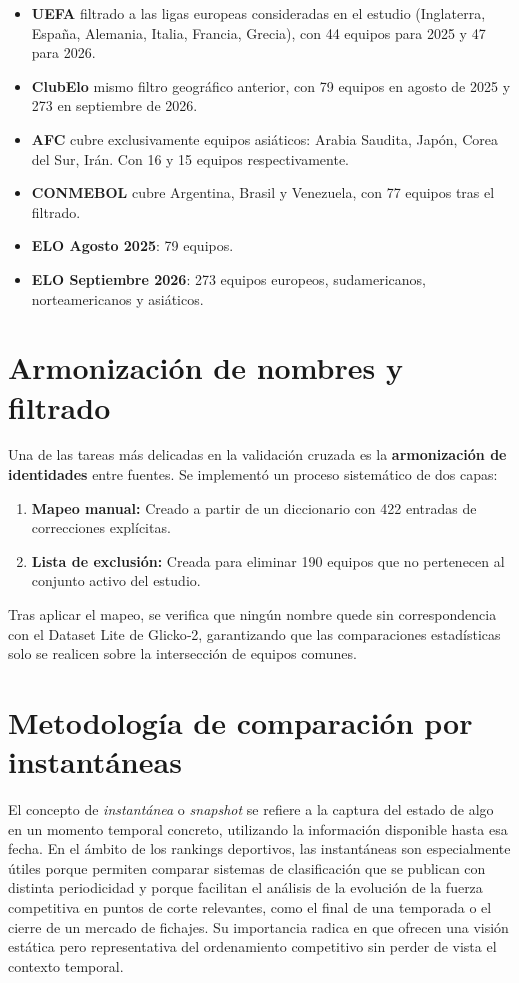 \begin{itemize}	
	\item \textbf{UEFA} filtrado a las ligas europeas consideradas en el estudio (Inglaterra, Espa\~na, Alemania, Italia, Francia, Grecia), con 44 equipos para 2025 y 47 para 2026.
	\item \textbf{ClubElo} mismo filtro geogr\'afico anterior, con 79 equipos en agosto de 2025 y 273 en septiembre de 2026.
	\item \textbf{AFC} cubre exclusivamente equipos asi\'aticos: Arabia Saudita, Jap\'on, Corea del Sur, Ir\'an. Con 16 y 15 equipos respectivamente.
	\item \textbf{CONMEBOL} cubre Argentina, Brasil y Venezuela, con 77 equipos tras el filtrado.
	\item \textbf{ELO Agosto 2025}: 79 equipos.
	\item \textbf{ELO Septiembre 2026}: 273 equipos europeos, sudamericanos, norteamericanos y asi\'aticos.
\end{itemize}

\section{Armonizaci\'on de nombres y filtrado}

Una de las tareas m\'as delicadas en la validaci\'on cruzada es la \textbf{armonizaci\'on de identidades} entre fuentes. Se implement\'o un proceso sistem\'atico de dos capas:
\begin{enumerate}
	\item \textbf{Mapeo manual:} Creado a partir de un diccionario con 422 entradas de correcciones expl\'icitas.
	\item \textbf{Lista de exclusi\'on:} Creada para eliminar 190 equipos que no pertenecen al conjunto activo del estudio.
\end{enumerate}

Tras aplicar el mapeo, se verifica que ning\'un nombre quede sin correspondencia con el Dataset Lite de Glicko‑2, garantizando que las comparaciones estad\'isticas solo se realicen sobre la intersecci\'on de equipos comunes.

\section{Metodolog\'ia de comparaci\'on por instant\'aneas}

El concepto de \textit{instant\'anea} o \textit{snapshot} se refiere a la captura del estado de algo en un momento temporal concreto, utilizando la informaci\'on disponible hasta esa fecha. En el \'ambito de los rankings deportivos, las instant\'aneas son especialmente \'utiles porque permiten comparar sistemas de clasificaci\'on que se publican con distinta periodicidad y porque facilitan el an\'alisis de la evoluci\'on de la fuerza competitiva en puntos de corte relevantes, como el final de una temporada o el cierre de un mercado de fichajes. Su importancia radica en que ofrecen una visi\'on est\'atica pero representativa del ordenamiento competitivo sin perder de vista el contexto temporal.

